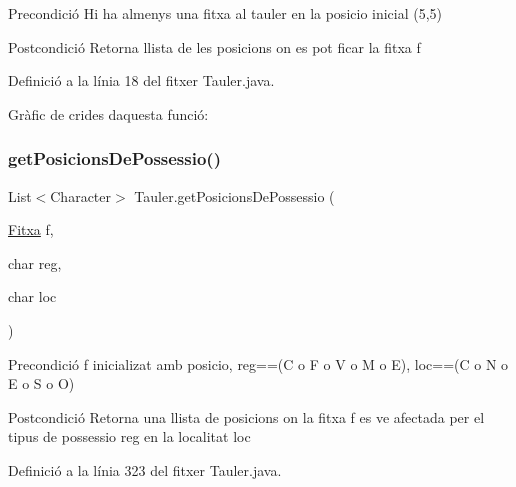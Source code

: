 \begin{DoxyPrecond}{Precondició}
Hi ha almenys una fitxa al tauler en la posicio inicial (5,5) 
\end{DoxyPrecond}
\begin{DoxyPostcond}{Postcondició}
Retorna llista de les posicions on es pot ficar la fitxa f 
\end{DoxyPostcond}


Definició a la línia 18 del fitxer Tauler.\+java.

Gràfic de crides d\textquotesingle{}aquesta funció\+:
\mbox{\label{class_tauler_af80e16c20bca52f2717be44a6242193e}} 
\subsubsection{\texorpdfstring{get\+Posicions\+De\+Possessio()}{getPosicionsDePossessio()}}
{\footnotesize\ttfamily List$<$Character$>$ Tauler.\+get\+Posicions\+De\+Possessio (\begin{DoxyParamCaption}\item[{\mbox{\hyperlink{class_fitxa}{Fitxa}}}]{f,  }\item[{char}]{reg,  }\item[{char}]{loc }\end{DoxyParamCaption})\hspace{0.3cm}{\ttfamily [private]}}

\begin{DoxyPrecond}{Precondició}
f inicializat amb posicio, reg==(\textquotesingle{}C\textquotesingle{} o \textquotesingle{}F\textquotesingle{} o \textquotesingle{}V\textquotesingle{} o \textquotesingle{}M\textquotesingle{} o \textquotesingle{}E\textquotesingle{}), loc==(\textquotesingle{}C\textquotesingle{} o \textquotesingle{}N\textquotesingle{} o \textquotesingle{}E\textquotesingle{} o \textquotesingle{}S\textquotesingle{} o \textquotesingle{}O\textquotesingle{}) 
\end{DoxyPrecond}
\begin{DoxyPostcond}{Postcondició}
Retorna una llista de posicions on la fitxa f es ve afectada per el tipus de possessio reg en la localitat loc 
\end{DoxyPostcond}


Definició a la línia 323 del fitxer Tauler.\+java.

